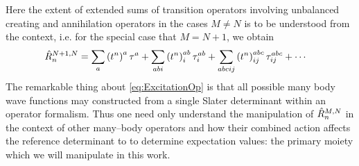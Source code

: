 Here the extent of extended sums of transition operators involving unbalanced creating and annihilation operators in the cases $M\neq N$ is to be understood from
the context, i.e. for the special case that $M= N+1$, we obtain
\begin{align}
&\hat{R}_n^{N+1,N} = \sum_a \left( t^n \right)^a \tau^a + \sum_{abi} \left( t^n \right)^{ab}_i \tau^{ab}_i + 
  \sum_{abcij} \left( t^n \right)^{abc}_{ij} \tau^{abc}_{ij} + \cdots
\end{align}
The remarkable thing about \cref{eq:ExcitationOp} is that all possible many body wave functions may constructed from a single Slater determinant
within an operator formalism. Thus one need only understand the manipulation of $\hat{R}^{M,N}_n$ in the context of other many--body operators
and how their combined action affects the reference determinant to to determine expectation values: the primary moiety which we will 
manipulate in this work.

